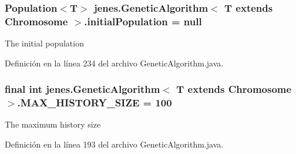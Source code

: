 \hypertarget{classjenes_1_1_genetic_algorithm_3_01_t_01extends_01_chromosome_01_4_ab6535da7a5097e18e6305d0f26f7cf5f}{
\subsubsection[{initial\-Population}]{\setlength{\rightskip}{0pt plus 5cm}Population$<$T$>$ jenes.\-Genetic\-Algorithm$<$ T extends Chromosome $>$.initial\-Population = null\hspace{0.3cm}{\ttfamily [protected]}}}\label{classjenes_1_1_genetic_algorithm_3_01_t_01extends_01_chromosome_01_4_ab6535da7a5097e18e6305d0f26f7cf5f}
The initial population 

Definición en la línea 234 del archivo Genetic\-Algorithm.\-java.

\hypertarget{classjenes_1_1_genetic_algorithm_3_01_t_01extends_01_chromosome_01_4_acd26085cf69c68d607ef08d0bf829224}{
\subsubsection[{M\-A\-X\-\_\-\-H\-I\-S\-T\-O\-R\-Y\-\_\-\-S\-I\-Z\-E}]{\setlength{\rightskip}{0pt plus 5cm}final int jenes.\-Genetic\-Algorithm$<$ T extends Chromosome $>$.M\-A\-X\-\_\-\-H\-I\-S\-T\-O\-R\-Y\-\_\-\-S\-I\-Z\-E = 100\hspace{0.3cm}{\ttfamily [static]}}}\label{classjenes_1_1_genetic_algorithm_3_01_t_01extends_01_chromosome_01_4_acd26085cf69c68d607ef08d0bf829224}
The maximum history size 

Definición en la línea 193 del archivo Genetic\-Algorithm.\-java.

